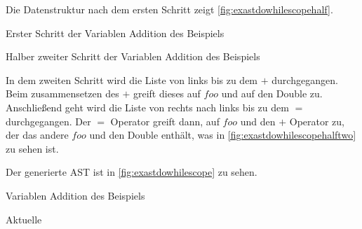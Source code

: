 {{{        Die Datenstruktur nach dem ersten Schritt zeigt \autoref{fig:exastdowhilescopehalf}.
        \begin{paracol}{2}
          \begin{myCodeEnv}
            \centering
            \begin{myInvBox}[width=.9\linewidth]
              
            \end{myInvBox}
            \caption{Erster Schritt der Variablen Addition des Beispiels}
            \label{fig:exastdowhilescopehalf}
          \end{myCodeEnv}
          \switchcolumn
          \begin{myCodeEnv}
            \centering
            \begin{myInvBox}[width=.9\linewidth]
              
            \end{myInvBox}
            \caption{Halber zweiter Schritt der Variablen Addition des Beispiels}
            \label{fig:exastdowhilescopehalftwo}
          \end{myCodeEnv}
        \end{paracol}

        In dem zweiten Schritt wird die Liste von links bis zu dem \myMIn$+$ durchgegangen. Beim zusammensetzen des \myMIn$+$ greift dieses auf \myMIn$foo$ und auf den Double zu. Anschließend geht wird die Liste von rechts nach links bis zu dem \myMIn$=$ durchgegangen. Der \myMIn$=$ Operator greift dann, auf \myMIn$foo$ und den \myMIn$+$ Operator zu, der das andere \myMIn$foo$ und den Double enthält, was in \autoref{fig:exastdowhilescopehalftwo} zu sehen ist.

        Der generierte AST ist in \autoref{fig:exastdowhilescope} zu sehen.
        \begin{paracol}{2}
          \begin{myCodeEnv}
            \centering
            \begin{myInvBox}[width=.9\linewidth]
              
            \end{myInvBox}
            \caption{Variablen Addition des Beispiels}
            \label{fig:exastdowhilescope}
          \end{myCodeEnv}
          \switchcolumn
          \begin{myCodeEnv}
            \centering
            \begin{myInvBox}[width=.9\linewidth]
              
            \end{myInvBox}
            \caption*{Aktuelle }
          \end{myCodeEnv}
        \end{paracol}

}}}
